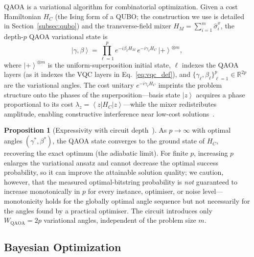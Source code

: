 \documentclass[11pt,a4paper]{article}
\theoremstyle{definition}
\newtheorem{proposition}{Proposition}[section]
\newcommand{\ket}[1]{\left\lvert #1 \right\rangle}
\newcommand{\bra}[1]{\left\langle #1 \right\rvert}
\begin{document}
QAOA is a variational algorithm for combinatorial optimization. Given a cost Hamiltonian $H_C$ (the Ising form of a QUBO; the construction we use is detailed in Section~\ref{subsec:qubo}) and the transverse-field mixer $H_M = \sum_{i=1}^{m}\hat{\sigma}_i^x$, the depth-$p$ QAOA variational state is
\begin{equation}
  \ket{\gamma,\beta}
  = \prod_{\ell=1}^{p} e^{-i\beta_\ell H_M}\,e^{-i\gamma_\ell H_C}\,\ket{+}^{\otimes m},
  \label{eq:qaoa_def}
\end{equation}
where $\ket{+}^{\otimes m}$ is the uniform-superposition initial state, $\ell$ indexes the QAOA layers (as it indexes the VQC layers in Eq.~\eqref{eq:vqc_def}), and $\{\gamma_\ell, \beta_\ell\}_{\ell=1}^p \in \mathbb{R}^{2p}$ are the variational angles. The cost unitary $e^{-i\gamma_\ell H_C}$ imprints the problem structure onto the phases of the superposition---basis state $\ket{z}$ acquires a phase proportional to its cost $\lambda_z = \bra{z}H_C\ket{z}$---while the mixer redistributes amplitude, enabling constructive interference near low-cost solutions~\cite{farhi2014quantum,zhou2020qaoa}.

\begin{proposition}[Expressivity with circuit depth~{\cite{farhi2014quantum}}]
\label{prop:qaoa_convergence}
As $p \to \infty$ with optimal angles $(\gamma^*, \beta^*)$, the QAOA state converges to the ground state of $H_C$, recovering the exact optimum (the adiabatic limit). For finite $p$, increasing $p$ enlarges the variational ansatz and cannot decrease the optimal success probability, so it can improve the attainable solution quality; we caution, however, that the measured optimal-bitstring probability is \emph{not} guaranteed to increase monotonically in $p$ for every instance, optimiser, or noise level---monotonicity holds for the globally optimal angle sequence but not necessarily for the angles found by a practical optimiser. The circuit introduces only $W_{\mathrm{QAOA}} = 2p$ variational angles, independent of the problem size $m$.
\end{proposition}

\subsection{Bayesian Optimization}
\label{subsec:bg_bo}
\end{document}
